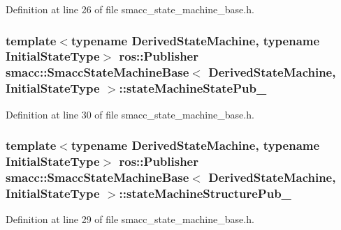 Definition at line 26 of file smacc\+\_\+state\+\_\+machine\+\_\+base.\+h.

\subsubsection[{\texorpdfstring{state\+Machine\+State\+Pub\+\_\+}{stateMachineStatePub_}}]{\setlength{\rightskip}{0pt plus 5cm}template$<$typename Derived\+State\+Machine, typename Initial\+State\+Type$>$ ros\+::\+Publisher {\bf smacc\+::\+Smacc\+State\+Machine\+Base}$<$ Derived\+State\+Machine, Initial\+State\+Type $>$\+::state\+Machine\+State\+Pub\+\_\+}\hypertarget{structsmacc_1_1SmaccStateMachineBase_a7c76e7a7d6c00d9831472297ff51e38c}{}\label{structsmacc_1_1SmaccStateMachineBase_a7c76e7a7d6c00d9831472297ff51e38c}


Definition at line 30 of file smacc\+\_\+state\+\_\+machine\+\_\+base.\+h.

\subsubsection[{\texorpdfstring{state\+Machine\+Structure\+Pub\+\_\+}{stateMachineStructurePub_}}]{\setlength{\rightskip}{0pt plus 5cm}template$<$typename Derived\+State\+Machine, typename Initial\+State\+Type$>$ ros\+::\+Publisher {\bf smacc\+::\+Smacc\+State\+Machine\+Base}$<$ Derived\+State\+Machine, Initial\+State\+Type $>$\+::state\+Machine\+Structure\+Pub\+\_\+}\hypertarget{structsmacc_1_1SmaccStateMachineBase_af586b32d0f79caba26c2dbca76a55767}{}\label{structsmacc_1_1SmaccStateMachineBase_af586b32d0f79caba26c2dbca76a55767}


Definition at line 29 of file smacc\+\_\+state\+\_\+machine\+\_\+base.\+h.

